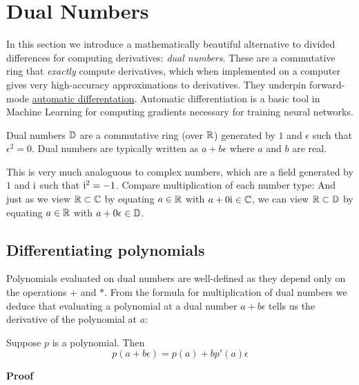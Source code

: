 
\section{Dual Numbers}
In this section we introduce a mathematically beautiful  alternative to divided differences for computing derivatives: \emph{dual numbers}. These are a commutative ring that \emph{exactly} compute derivatives, which when implemented on a computer gives very high-accuracy approximations to derivatives. They underpin forward-mode \href{https://en.wikipedia.org/wiki/Automatic_differentiation}{automatic differentation}. Automatic differentiation  is a basic tool in Machine Learning for computing gradients necessary for training neural networks.

\begin{definition} Dual numbers ${\mathbb D}$ are a commutative ring (over ${\mathbb R}$) generated by $1$ and $\ensuremath{\epsilon}$ such that $\ensuremath{\epsilon}^2 = 0$. Dual numbers are typically written as $a + b \ensuremath{\epsilon}$ where $a$ and $b$ are real. \end{definition}

This is very much analoguous to complex numbers, which are a field generated by $1$ and ${\rm i}$ such that ${\rm i}^2 = -1$. Compare multiplication of each number type:
And just as we view ${\mathbb R} \subset {\mathbb C}$ by equating $a \in {\mathbb R}$ with $a + 0{\rm i} \in {\mathbb C}$, we can view ${\mathbb R} \subset {\mathbb D}$ by equating $a \in {\mathbb R}$ with $a + 0{\rm \epsilon} \in {\mathbb D}$.

\subsection{Differentiating polynomials}
Polynomials evaluated on dual numbers are well-defined as they depend only on the operations $+$ and $*$. From the formula for multiplication of dual numbers we deduce that evaluating a polynomial at a dual number $a + b \ensuremath{\epsilon}$ tells us the derivative of the polynomial at $a$:

\begin{theorem} Suppose $p$ is a polynomial. Then
\[
p(a + b \ensuremath{\epsilon}) = p(a) + b p'(a) \ensuremath{\epsilon}
\]
\end{theorem}
\textbf{Proof}

